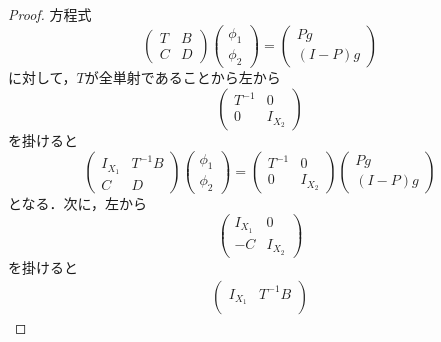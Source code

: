 \documentclass[11pt,a4paper,titlepage]{jsreport}
\theoremstyle{definition}
\begin{document}
\begin{proof}
  方程式
  \begin{equation*}
    \begin{pmatrix}
      T & B \\
      C & D
    \end{pmatrix}
    \begin{pmatrix}
      \phi_1 \\
      \phi_2
    \end{pmatrix}
    =
    \begin{pmatrix}
      Pg \\
      (I-P)g
    \end{pmatrix}
  \end{equation*}
  に対して，$T$が全単射であることから左から
  \begin{equation*}
    \begin{pmatrix}
      T^{-1} & 0 \\
      0 & I_{X_2}
    \end{pmatrix}
  \end{equation*}
  を掛けると
  \begin{equation*}
    \begin{pmatrix}
      I_{X_1} & T^{-1}B \\
      C & D
    \end{pmatrix}
    \begin{pmatrix}
      \phi_1 \\
      \phi_2
    \end{pmatrix}
    =
    \begin{pmatrix}
      T^{-1} & 0 \\
      0 & I_{X_2}
    \end{pmatrix}
    \begin{pmatrix}
      Pg \\
      (I-P)g
    \end{pmatrix}
  \end{equation*}
  となる．次に，左から
  \begin{equation*}
    \begin{pmatrix}
      I_{X_1} & 0 \\
      -C & I_{X_2}
    \end{pmatrix}
  \end{equation*}
  を掛けると
  \begin{equation}
    \label{eq:6-4}
    \begin{split}
      \begin{pmatrix}
        I_{X_1} & T^{-1}B \\

\end{pmatrix}
\end{split}
\end{equation}
\end{proof}
\end{document}
